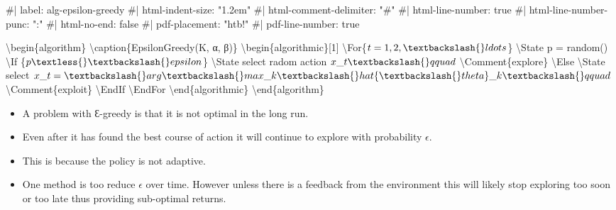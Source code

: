 \documentclass[
  letterpaper,
  DIV=11,
  numbers=noendperiod,
  oneside]{scrartcl}
\newenvironment{Shaded}{\begin{snugshade}}{\end{snugshade}}
\newcommand{\NormalTok}[1]{\textcolor[rgb]{0.00,0.23,0.31}{#1}}
\providecommand{\tightlist}{%
  \setlength{\itemsep}{0pt}\setlength{\parskip}{0pt}}\usepackage{longtable,booktabs,array}
\theoremstyle{definition}
\theoremstyle{remark}
\begin{document}
\begin{Shaded}
\begin{Highlighting}[]
\NormalTok{\#| label: alg{-}epsilon{-}greedy}
\NormalTok{\#| html{-}indent{-}size: "1.2em"}
\NormalTok{\#| html{-}comment{-}delimiter: "\#"}
\NormalTok{\#| html{-}line{-}number: true}
\NormalTok{\#| html{-}line{-}number{-}punc: ":"}
\NormalTok{\#| html{-}no{-}end: false}
\NormalTok{\#| pdf{-}placement: "htb!"}
\NormalTok{\#| pdf{-}line{-}number: true}

\NormalTok{\textbackslash{}begin\{algorithm\}}
\NormalTok{\textbackslash{}caption\{EpsilonGreedy(K, α, β)\}}
\NormalTok{\textbackslash{}begin\{algorithmic\}[1]}
\NormalTok{\textbackslash{}For\{$t = 1, 2, \textbackslash{}ldots $\}}
\NormalTok{\textbackslash{}State p = random()}
\NormalTok{  \textbackslash{}If \{$p \textless{} \textbackslash{}epsilon$\}}
\NormalTok{    \textbackslash{}State select radom action $x\_t \textbackslash{}qquad$ \textbackslash{}Comment\{explore\}}
\NormalTok{  \textbackslash{}Else}
\NormalTok{    \textbackslash{}State select $x\_t = \textbackslash{}arg\textbackslash{}max\_k \textbackslash{}hat\{\textbackslash{}theta\}\_k \textbackslash{}qquad$  \textbackslash{}Comment\{exploit\}}
\NormalTok{  \textbackslash{}EndIf}
\NormalTok{\textbackslash{}EndFor}
\NormalTok{\textbackslash{}end\{algorithmic\}}
\NormalTok{\textbackslash{}end\{algorithm\}}
\end{Highlighting}
\end{Shaded}

\begin{tcolorbox}[enhanced jigsaw, left=2mm, leftrule=.75mm, bottomtitle=1mm, toptitle=1mm, title=\textcolor{quarto-callout-caution-color}{\faFire}\hspace{0.5em}{The problem with Ɛ-greedy policies}, breakable, toprule=.15mm, colbacktitle=quarto-callout-caution-color!10!white, coltitle=black, colback=white, opacityback=0, rightrule=.15mm, bottomrule=.15mm, colframe=quarto-callout-caution-color-frame, titlerule=0mm, opacitybacktitle=0.6, arc=.35mm]

\begin{itemize}
\tightlist
\item
  A problem with Ɛ-greedy is that it is not optimal in the long run.
\item
  Even after it has found the best course of action it will continue to
  explore with probability \(\epsilon\).
\item
  This is because the policy is not adaptive.
\item
  One method is too reduce \(\epsilon\) over time. However unless there
  is a feedback from the environment this will likely stop exploring too
  soon or too late thus providing sub-optimal returns.
\end{itemize}

\end{tcolorbox}
\end{document}
